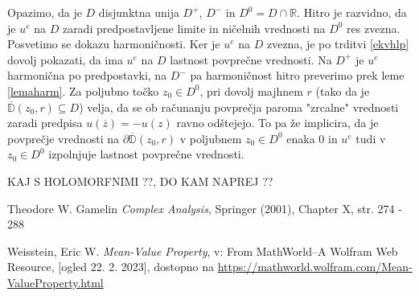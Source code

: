 \documentclass[mat1]{fmfdelo}
\begin{document}
    \begin{dokaz}
        Opazimo, da je $D$ disjunktna unija $D^+$, $D^-$ in $D^0 = D \cap \mathbb{R}$.
        Hitro je razvidno, da je $u^e$ na $D$ zaradi predpostavljene limite in ničelnih vrednosti na $D^0$ res zvezna. 
        \newline
        Posvetimo se dokazu harmoničnosti. Ker je $u^e$ na $D$ zvezna, je po trditvi \ref{ekvhlp} dovolj pokazati, da ima $u^e$ na $D$ lastnost povprečne vrednosti.
        Na $D^+$ je $u^e$ harmonična po predpostavki, na $D^-$ pa harmoničnost hitro preverimo prek leme \ref{lemaharm}. 
        Za poljubno točko $z_0 \in D^0$, pri dovolj majhnem $r$ (tako da je $\overline{\mathbb{D}}(z_0,r) \subseteq D$) velja, da se ob računanju povprečja paroma "zrcalne" vrednosti zaradi predpisa $u(\overline{z}) = - u(z)$ ravno odštejejo. 
        To pa že implicira, da je povprečje vrednosti na $\partial \overline{\mathbb{D}}(z_0,r)$ v poljubnem $z_0 \in D^0$ enaka $0$ in $u^e$ tudi v $z_0 \in D^0$ izpolnjuje lastnost povprečne vrednosti.
    \end{dokaz}

    KAJ S HOLOMORFNIMI ??, DO KAM NAPREJ ??
\newpage


\begin{thebibliography}{9}
    Theodore W. Gamelin \emph{Complex Analysis}, Springer (2001), Chapter X, str. 274 - 288

    Weisstein, Eric W. \emph{Mean-Value Property}, v: From MathWorld--A Wolfram Web Resource, [ogled 22. 2. 2023], dostopno na \href{https://mathworld.wolfram.com/Mean-ValueProperty.html}{https://mathworld.wolfram.com/Mean-ValueProperty.html}
\end{thebibliography}
\end{document}
